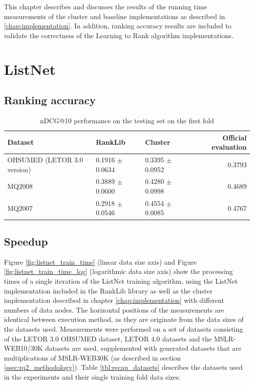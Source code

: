 This chapter describes and discusses the results of the running time measurements of the cluster and baseline implementations as described in \ref{chap:implementation}. In addition, ranking accuracy results are included to validate the correctness of the Learning to Rank algorithm implementations.
\section{ListNet}
\subsection{Ranking accuracy}
\begin{table}[!h]
\centering
\begin{tabular}{p{6cm}p{1.6cm}p{1.4cm}r}\toprule
Dataset & RankLib & Cluster & Official evaluation \\
\midrule
OHSUMED (LETOR 3.0 version) & 0.1916 $\pm$ 0.0634 & 0.3395 $\pm$ 0.0952 & 0.3793 \\
MQ2008      				& 0.3889 $\pm$ 0.0600 & 0.4280 $\pm$ 0.0998 & 0.4689 \\
MQ2007      				& 0.2918 $\pm$ 0.0546 & 0.4554 $\pm$ 0.0085 & 0.4767 \\
\bottomrule
\end{tabular}
\caption{\acs{nDCG}@10 performance on the testing set on the first fold}
\label{tbl:accuracy_comparison}
\end{table}

\subsection{Speedup}
Figure \ref{fig:listnet_train_time} (linear data size axis) and Figure \ref{fig:listnet_train_time_log} (logarithmic data size axis) show the processing times of a single iteration of the ListNet training algorithm, using the ListNet implementation included in the RankLib library as well as the cluster implementation described in chapter \ref{chap:implementation} with different numbers of data nodes. The horizontal positions of the measurements are identical between execution method, as they are originate from the data sizes of the datasets used. Measurements were performed on a set of datasets consisting of the LETOR 3.0 OHSUMED dataset, LETOR 4.0 datasets and the MSLR-WEB10/30K datasets are used, supplemented with generated datasets that are multiplications of MSLR-WEB30K (as described in section \ref{ssec:rq2_methodology}). Table \ref{tbl:recap_datasets} describes the datasets used in the experiments and their single training fold data sizes.\\

